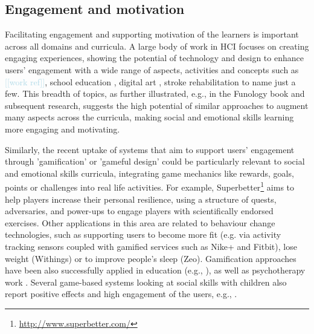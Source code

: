 \documentclass[prodmode,acmtochi]{acmsmall}
\newcommand{\todo}[1]{\textrm{\textrm{\textcolor{LightBlue}{[[#1]]}}}}
\newcommand{\GeraldineFIX}[1]{}
\begin{document}
\subsection{Engagement and motivation}

Facilitating engagement and supporting motivation of the learners is important across all domains and curricula. %
%
A large body of work in HCI focuses on creating engaging experiences, showing the potential of technology and design to enhance users' engagement with a wide range of aspects, activities and concepts such as \todo{work ref}, school education \cite{Connolly2012,Bers2010}, digital art \cite{Edmonds2013}, stroke rehabilitation \cite{Balaam2011a} to name just a few. This breadth of topics, as further illustrated, e.g., in the Funology book \cite{blythe2004funology} and subsequent research, suggests the high potential of similar approaches to augment many aspects across the curricula, making social and emotional skills learning more engaging and motivating.

Similarly, the recent uptake of systems that aim to support users' engagement through 'gamification' or 'gameful design' \cite{Deterding2011,McGonigal2011} \GeraldineFIX{G: have to be careful about who we claim as HCI eg don't imagine mcgonigal would label herself as hci  \\P: is this ok now? I don't think we are claiming it to be HCI ... the newly added 'similarly' maybe can help emphasise this?}could be particularly relevant to social and emotional skills curricula,  integrating game mechanics like rewards, goals, points or challenges into real life activities.  
%
For example, Superbetter\footnote{\url{http://www.superbetter.com/}} aims to help players increase their personal resilience, using a structure of quests, adversaries, and power-ups to engage players with scientifically endorsed exercises. Other applications in this area are related to behaviour change technologies, such as supporting users to become more fit (e.g. via activity tracking sensors coupled with gamified services such as Nike+ and Fitbit), lose weight  (Withings) or to improve people's sleep (Zeo). 
%
Gamification approaches have been also successfully applied in education (e.g., \cite{torres2011quest,Sheldon2011,Mamykina2008}), as well as psychotherapy work \cite{Goh2008,Piper2006}. %
Several game-based systems looking at social skills with children also report positive effects and high engagement of the users, e.g., \cite{Hourcade2013,Hendrix2009a}.
\end{document}
